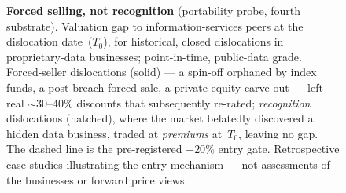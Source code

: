 \documentclass[11pt]{article}
\begin{document}
\begin{figure}[h]
\caption{\textbf{Forced selling, not recognition} (portability probe, fourth substrate).
Valuation gap to information-services peers at the dislocation date~($T_0$), for
historical, closed dislocations in proprietary-data businesses; point-in-time,
public-data grade. Forced-seller dislocations (solid) --- a spin-off orphaned by index
funds, a post-breach forced sale, a private-equity carve-out --- left real $\sim$30--40\%
discounts that subsequently re-rated; \emph{recognition} dislocations (hatched), where the
market belatedly discovered a hidden data business, traded at \emph{premiums} at~$T_0$,
leaving no gap. The dashed line is the pre-registered $-20\%$ entry gate. Retrospective
case studies illustrating the entry mechanism --- not assessments of the businesses or
forward price views.}
\label{fig:forced-seller}
\end{figure}
\end{document}
